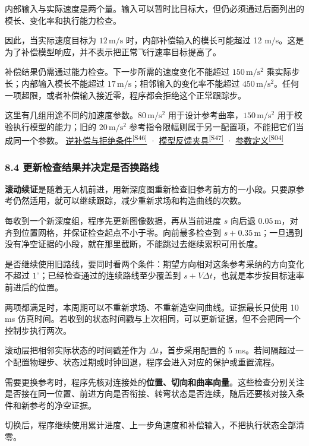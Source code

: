 \documentclass[12pt,a4paper]{article}
\numberwithin{equation}{topic}
\newcommand{\sourceref}[2]{\hyperlink{source-#1}{#2\textsuperscript{[#1]}}}
\begin{document}
内部输入与实际速度是两个量。输入可以暂时比目标大，但仍必须通过后面列出的模长、变化率和执行能力检查。


因此，当实际速度目标为 \(12\,\mathrm{m/s}\) 时，内部补偿输入的模长可能超过 12 m/s。这是为了补偿模型响应，并不表示把正常飞行速率目标提高了。

补偿结果仍需通过能力检查。下一步所需的速度变化不能超过 \(150\,\mathrm{m/s^2}\) 乘实际步长；内部输入模长不能超过 \(17\,\mathrm{m/s}\)；相邻输入的变化率不能超过 \(450\,\mathrm{m/s^2}\)。任何一项超限，或者补偿输入接近零，程序都会拒绝这个正常跟踪步。

这里有几组用途不同的加速度参数。\(80\,\mathrm{m/s^2}\) 用于设计参考曲率，\(150\,\mathrm{m/s^2}\) 用于校验执行模型的能力；旧的 \(20\,\mathrm{m/s^2}\) 参考指令限幅则属于另一配置项，不能把它们当成同一个参数。 \sourceref{S46}{逆补偿与拒绝条件} · \sourceref{S47}{模型反馈夹具} · \sourceref{S04}{参数定义}

\subsubsection*{8.4 更新检查结果并决定是否换路线}

\textbf{滚动续证}是随着无人机前进，用新深度图重新检查旧参考前方的一小段。只要原参考仍然适用，就可以继续跟踪，减少重新求场和构造曲线的次数。

每收到一个新深度组，程序先更新图像数据，再从当前进度 \(s\) 向后退 \(0.05\,\mathrm m\)，对齐到位置网格，并保证检查起点不小于零。向前最多检查到 \(s+0.35\,\mathrm m\)；一旦遇到没有净空证据的小段，就在那里截断，不能跳过去继续累积可用长度。

是否继续使用旧路线，要同时看两个条件：期望方向相对这条参考采纳的方向变化不超过 \(1^\circ\)；已经检查通过的连续路线至少覆盖到 \(s+V\Delta t\)，也就是本步按目标速率前进后的位置。

两项都满足时，本周期可以不重新求场、不重新造空间曲线。证据最长只使用 10 ms 仿真时间。若收到的状态时间戳与上次相同，可以更新证据，但不会把同一个控制步执行两次。

滚动层把相邻实际状态的时间戳差作为 \(\Delta t\)，首步采用配置的 5 ms。若间隔超过一个配置物理步、状态过期或时钟回退，程序会进入对应的保护或重置流程。

需要更换参考时，程序先核对连接处的\textbf{位置、切向和曲率向量}。这些检查分别关注是否接在同一位置、前进方向是否衔接、转弯状态是否连续，随后还要核对接入条件和新参考的净空证据。

切换后，程序继续使用累计进度、上一步角速度和补偿输入，不把执行状态全部清零。
\end{document}

